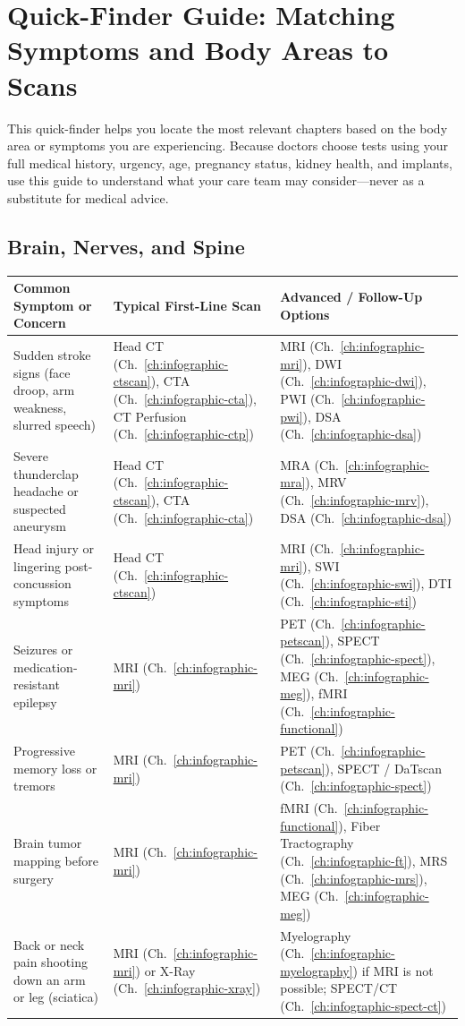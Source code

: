 \chapter{Quick-Finder Guide: Matching Symptoms and Body Areas to Scans}
\label{app:quick-finder}

\noindent
This quick-finder helps you locate the most relevant chapters based on the body area or symptoms you are experiencing. Because doctors choose tests using your full medical history, urgency, age, pregnancy status, kidney health, and implants, use this guide to understand what your care team may consider---never as a substitute for medical advice.

\section{Brain, Nerves, and Spine}
{\renewcommand{\arraystretch}{1.25}\noindent
\begin{tabularx}{\textwidth}{@{}p{} p{} X@{}}
\toprule
\textbf{Common Symptom or Concern} & \textbf{Typical First-Line Scan} & \textbf{Advanced / Follow-Up Options} \\
\midrule
Sudden stroke signs (face droop, arm weakness, slurred speech) & Head CT (Ch.~\ref{ch:infographic-ctscan}), CTA (Ch.~\ref{ch:infographic-cta}), CT Perfusion (Ch.~\ref{ch:infographic-ctp}) & MRI (Ch.~\ref{ch:infographic-mri}), DWI (Ch.~\ref{ch:infographic-dwi}), PWI (Ch.~\ref{ch:infographic-pwi}), DSA (Ch.~\ref{ch:infographic-dsa}) \\
Severe thunderclap headache or suspected aneurysm & Head CT (Ch.~\ref{ch:infographic-ctscan}), CTA (Ch.~\ref{ch:infographic-cta}) & MRA (Ch.~\ref{ch:infographic-mra}), MRV (Ch.~\ref{ch:infographic-mrv}), DSA (Ch.~\ref{ch:infographic-dsa}) \\
Head injury or lingering post-concussion symptoms & Head CT (Ch.~\ref{ch:infographic-ctscan}) & MRI (Ch.~\ref{ch:infographic-mri}), SWI (Ch.~\ref{ch:infographic-swi}), DTI (Ch.~\ref{ch:infographic-sti}) \\
Seizures or medication-resistant epilepsy & MRI (Ch.~\ref{ch:infographic-mri}) & PET (Ch.~\ref{ch:infographic-petscan}), SPECT (Ch.~\ref{ch:infographic-spect}), MEG (Ch.~\ref{ch:infographic-meg}), fMRI (Ch.~\ref{ch:infographic-functional}) \\
Progressive memory loss or tremors & MRI (Ch.~\ref{ch:infographic-mri}) & PET (Ch.~\ref{ch:infographic-petscan}), SPECT / DaTscan (Ch.~\ref{ch:infographic-spect}) \\
Brain tumor mapping before surgery & MRI (Ch.~\ref{ch:infographic-mri}) & fMRI (Ch.~\ref{ch:infographic-functional}), Fiber Tractography (Ch.~\ref{ch:infographic-ft}), MRS (Ch.~\ref{ch:infographic-mrs}), MEG (Ch.~\ref{ch:infographic-meg}) \\
Back or neck pain shooting down an arm or leg (sciatica) & MRI (Ch.~\ref{ch:infographic-mri}) or X-Ray (Ch.~\ref{ch:infographic-xray}) & Myelography (Ch.~\ref{ch:infographic-myelography}) if MRI is not possible; SPECT/CT (Ch.~\ref{ch:infographic-spect-ct}) \\
\bottomrule
\end{tabularx}}

